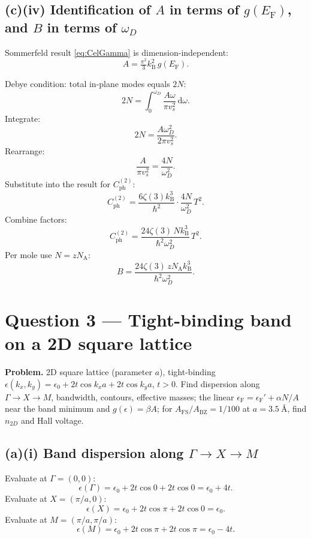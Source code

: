 \documentclass[11pt]{article}
\newcommand{\de}{\mathrm{d}}
\newcommand{\kB}{k_{\mathrm{B}}}
\newcommand{\NA}{N_{\mathrm{A}}}
\newcommand{\EF}{E_{\mathrm{F}}}
\newcommand{\eF}{\epsilon_{\mathrm{F}}}
\begin{document}
\subsection*{(c)(iv) Identification of $A$ in terms of $g(\EF)$, and $B$ in terms of $\omega_D$}

Sommerfeld result \eqref{eq:CelGamma} is dimension-independent:
\begin{equation}
\boxed{\ A = \tfrac{\pi^2}{3}\kB^2\,g(\EF).\ }
\label{eq:Aresult}
\end{equation}

Debye condition: total in-plane modes equals $2N$:
\[
2N = \int_0^{\omega_D}\frac{A\omega}{\pi v_s^2}\,\de\omega.
\]
Integrate:
\[
2N = \frac{A\omega_D^2}{2\pi v_s^2}.
\]
Rearrange:
\[
\frac{A}{\pi v_s^2} = \frac{4N}{\omega_D^2}.
\]
Substitute into the result for $C^{(2)}_{\mathrm{ph}}$:
\[
C^{(2)}_{\mathrm{ph}} = \frac{6\zeta(3)\kB^3}{\hbar^2}\cdot\frac{4N}{\omega_D^2}\,T^2.
\]
Combine factors:
\[
C^{(2)}_{\mathrm{ph}} = \frac{24\zeta(3)\,N\kB^3}{\hbar^2\omega_D^2}\,T^2.
\]
Per mole use $N=z\NA$:
\begin{equation}
\boxed{\ B = \frac{24\zeta(3)\,z\NA\kB^3}{\hbar^2\omega_D^2}.\ }
\label{eq:Bbox}
\end{equation}

\section*{Question 3 --- Tight-binding band on a 2D square lattice}

\textbf{Problem.} 2D square lattice (parameter $a$), tight-binding $\epsilon(k_x,k_y)=\epsilon_0+2t\cos k_xa+2t\cos k_ya$, $t>0$. Find dispersion along $\Gamma\to X\to M$, bandwidth, contours, effective masses; the linear $\eF=\eF'+\alpha N/A$ near the band minimum and $g(\epsilon)=\beta A$; for $A_{\mathrm{FS}}/A_{\mathrm{BZ}}=1/100$ at $a=\SI{3.5}{\angstrom}$, find $n_{2D}$ and Hall voltage.

\subsection*{(a)(i) Band dispersion along $\Gamma\to X\to M$}

Evaluate at $\Gamma=(0,0)$:
\[
\epsilon(\Gamma) = \epsilon_0 + 2t\cos 0 + 2t\cos 0 = \epsilon_0 + 4t.
\]
Evaluate at $X=(\pi/a,0)$:
\[
\epsilon(X) = \epsilon_0 + 2t\cos\pi + 2t\cos 0 = \epsilon_0.
\]
Evaluate at $M=(\pi/a,\pi/a)$:
\[
\epsilon(M) = \epsilon_0 + 2t\cos\pi + 2t\cos\pi = \epsilon_0 - 4t.
\]
\end{document}
